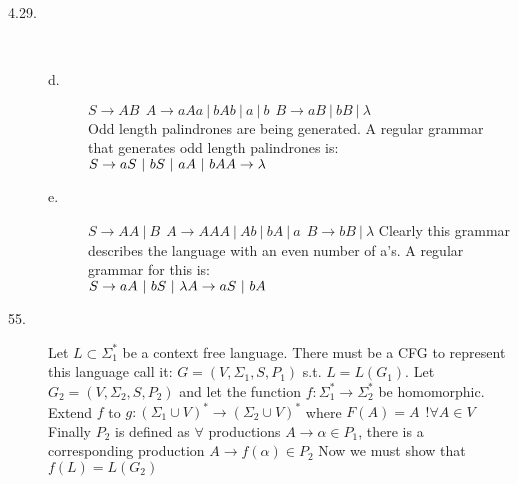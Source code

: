 \documentclass{article}
\begin{document}
\begin{description}
\begin{center}
  \end{center}

\item[4.29.]\hfill\\
  \begin{description}
    \item[d.]
      $S \rightarrow AB ~~ A \rightarrow aAa ~|~ bAb ~|~ a ~|~ b ~~ B \rightarrow aB ~|~ bB ~|~ \lambda$\\
      Odd length palindrones are being generated. A regular grammar that generates odd length palindrones is:\\
      $S \rightarrow aS ~|~ bS ~|~ aA ~|~ bA\\
      A \rightarrow \lambda$
    \item[e.]
      $S \rightarrow AA ~|~ B ~~ A \rightarrow AAA ~|~ Ab ~|~ bA ~|~ a ~~ B \rightarrow bB ~|~ \lambda$
      Clearly this grammar describes the language with an even number of a's. A regular grammar for this is:\\
      $S \rightarrow aA ~|~ bS ~|~ \lambda\\
      A  \rightarrow aS ~|~ bA$
  \end{description}

\item[55.]
  Let $L \subset \Sigma^*_1$ be a context free language. There must be a CFG to represent this language call it: $G = (V, \Sigma_1, S, P_1)$ s.t. $L = L(G_1)$.
  Let $G_2 = (V, \Sigma_2, S, P_2)$ and let the function $f: \Sigma_1^* \rightarrow \Sigma_2^*$ be homomorphic. Extend $f$ to $g: (\Sigma_1 \cup V)^* \rightarrow (\Sigma_2 \cup V)^*$ where $F(A) = A ~~! \forall A \in V$ 
  Finally $P_2$ is defined as $\forall$ productions $A \rightarrow \alpha \in P_1$, there is a corresponding production $A \rightarrow f(\alpha) \in P_2$ Now we must show that $f(L) = L(G_2)$


\end{description}
\end{document}
